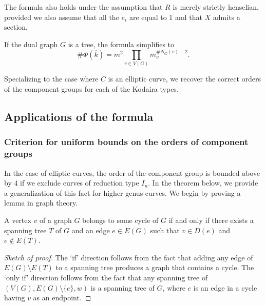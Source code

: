 \begin{rmk}
 The formula also holds under the assumption that $R$ is merely strictly henselian, provided we also assume that all the $e_i$ are equal to $1$ and that $X$ admits a section.
\end{rmk}
\begin{rmk}
 If the dual graph $G$ is a tree, the formula simplifies to 
 \[ \# \Phi(\overline{k}) = m^2 \prod_{v \in V(G)} m_{v}^{\# N_G(v)-2} .\] 
\end{rmk}
\begin{rmk}
 Specializing to the case where $C$ is an elliptic curve, we recover the correct orders of the component groups for each of the Kodaira types. 
\end{rmk}

\subsection{Applications of the formula}
\subsubsection{Criterion for uniform bounds on the orders of component groups}
In the case of elliptic curves, the order of the component group is bounded above by $4$ if we exclude curves of reduction type $I_n$. In the theorem below, we provide a generalization of this fact for higher genus curves. We begin by proving a lemma in graph theory.

\begin{lemma}\label{graph}
 A vertex $v$ of a graph $G$ belongs to some cycle of $G$ if and only if there exists a spanning tree $T$ of $G$ and an edge $e \in E(G)$ such that $v \in D(e)$ and $e \notin E(T)$.
\end{lemma}
\begin{proof}[Sketch of proof]
The `if' direction follows from the fact that adding any edge of $E(G) \setminus E(T)$ to a spanning tree produces a graph that contains a cycle. The `only if' direction follows from the fact that any spanning tree of $(V(G),E(G)\setminus \{e\},w)$ is a spanning tree of $G$, where $e$ is an edge in a cycle having $v$ as an endpoint.
\end{proof}

